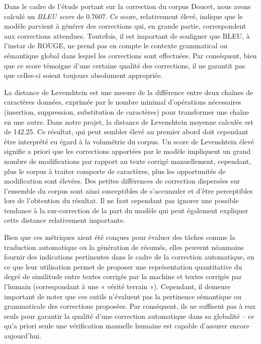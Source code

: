 Dans le cadre de l’étude portant sur la correction du corpus Doucet, nous avons calculé un \textit{BLEU score} de 0.7607. Ce score, relativement élevé, indique que le modèle parvient à générer des corrections qui, en grande partie, correspondent aux corrections attendues. Toutefois, il est important de souligner que BLEU, à l’instar de ROUGE, ne prend pas en compte le contexte grammatical ou sémantique global dans lequel les corrections sont effectuées. Par conséquent, bien que ce score témoigne d’une certaine qualité des corrections, il ne garantit pas que celles-ci soient toujours absolument appropriée.

\newline
La distance de Levenshtein est une mesure de la différence entre deux chaînes de caractères données, exprimée par le nombre minimal d’opérations nécessaires (insertion, suppression, substitution de caractères) pour transformer une chaîne en une autre.
Dans notre projet, la distance de Levenshtein moyenne calculée est de 142.25. Ce résultat, qui peut sembler élevé au premier abord doit cependant être interprété eu égard à la volumétrie du corpus. Un score de Levenshtein élevé signifie a priori que les corrections apportées par le modèle impliquent un grand nombre de modifications par rapport au texte corrigé manuellement, cependant, plus le corpus à traiter comporte de caractères, plus les opportunités de modification sont élevées. Des petites différences de correction dispersées sur l’ensemble du corpus sont ainsi susceptibles de s’accumuler et d’être perceptibles lors de l’obtention du résultat. Il ne faut cependant pas ignorer une possible tendance à la sur-correction de la part du modèle qui peut également expliquer cette distance relativement importante.

\newline
Bien que ces métriques aient été conçues pour évaluer des tâches comme la traduction automatique ou la génération de résumés, elles peuvent néanmoins fournir des indications pertinentes dans le cadre de la correction automatique, en ce que leur utilisation permet de proposer une représentation quantitative du degré de similitude entre textes corrigés par la machine et textes corrigés par l’humain (correspondant à une « vérité terrain »). Cependant, il demeure important de noter que ces outils n’évaluent pas la pertinence sémantique ou grammaticale des corrections proposées. Par conséquent, ils ne suffisent pas à eux seuls pour garantir la qualité d'une correction automatique dans sa globalité – ce qu’a priori seule une vérification manuelle humaine est capable d’assurer encore aujourd’hui.

